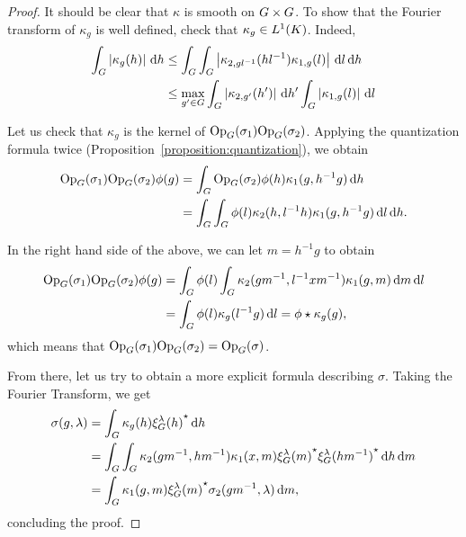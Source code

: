\begin{proof}
    It should be clear that $\kappa$ is smooth on $G \times G$.
    To show that the Fourier transform of $\kappa_g$ is well defined,
    check that $\kappa_g \in {L^{1} (K)}$.
    Indeed,
    \begin{align*}
        \int_G \left|{\kappa_g(h)}\right| \,\mathrm{d} h
        &\leq \int_G \int_G \left|{\kappa_{2, g l^{-1}}(h l^{-1}) \kappa_{1, g}(l)}\right| \,\mathrm{d} l \,\mathrm{d} h\\
        &\leq \max_{g' \in G} \int_G \left|{\kappa_{2, g'}(h')}\right| \,\mathrm{d} h'
        \int_G \left|{\kappa_{1, g}(l)}\right| \,\mathrm{d} l
    \end{align*}

    Let us check that $\kappa_g$ is the kernel of $\mathrm{Op}_{G}(\sigma_1) \mathrm{Op}_{G}(\sigma_2)$.
    Applying the quantization formula twice (Proposition~\ref{proposition:quantization}),
    we obtain
    \begin{align*}
        \mathrm{Op}_{G}(\sigma_1) \mathrm{Op}_{G}(\sigma_2) \phi(g)
        &= \int_G \mathrm{Op}_{G}(\sigma_2) \phi(h) \kappa_1(g, h^{-1} g) \,\mathrm{d} h\\
        &= \int_G \int_G \phi(l) \kappa_2(h, l^{-1} h) \kappa_1(g, h^{-1} g) \,\mathrm{d} l \,\mathrm{d} h.
    \end{align*}

    In the right hand side of the above,
    we can let $m = h^{-1} g$ to obtain
    \begin{align*}
        \mathrm{Op}_{G}(\sigma_1) \mathrm{Op}_{G}(\sigma_2) \phi(g)
        &= \int_G \phi(l) \int_G \kappa_2(g m^{-1}, l^{-1} x m^{-1}) \kappa_1(g, m) \,\mathrm{d} m \,\mathrm{d} l\\
        &= \int_G \phi(l) \kappa_g(l^{-1} g) \,\mathrm{d} l
        = \phi \star \kappa_g(g),
    \end{align*}
    which means that $\mathrm{Op}_{G}(\sigma_1) \mathrm{Op}_{G}(\sigma_2) = \mathrm{Op}_{G}(\sigma)$.

    From there, let us try to obtain a more explicit formula describing $\sigma$.
    Taking the Fourier Transform,
    we get
    \begin{align*}
        \sigma(g, \lambda)
        &= \int_G \kappa_g(h) {\xi^{\lambda}_{G}(h)}^\star \,\mathrm{d} h\\
        &= \int_G \int_G \kappa_2(g m^{-1}, h m^{-1}) \kappa_1(x, m) {\xi^{\lambda}_{G}(m)}^\star {\xi^{\lambda}_{G}(h m^{-1})}^\star \,\mathrm{d} h \,\mathrm{d} m\\
        &= \int_G \kappa_1(g, m) {\xi^{\lambda}_{G}(m)}^\star \sigma_2(g m^{-1}, \lambda) \,\mathrm{d} m,
    \end{align*}
    concluding the proof.
\end{proof}

